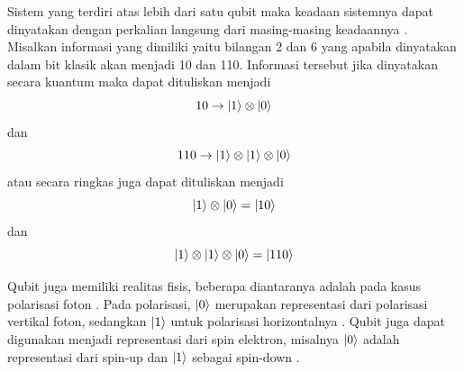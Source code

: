 \par
Sistem yang terdiri atas lebih dari satu qubit maka keadaan sistemnya dapat dinyatakan dengan perkalian langsung dari masing-masing keadaannya \cite{mermin2007quantum, bengtsson2017geometry, barnett2009quantum, schlosshauer2007decoherence}. Misalkan informasi yang dimiliki yaitu bilangan 2 dan 6 yang apabila dinyatakan dalam bit klasik akan menjadi 10 dan 110. Informasi tersebut jika dinyatakan secara kuantum maka dapat dituliskan menjadi
\begin{equation}
	10 \rightarrow \ket{1} \otimes \ket{0}
\end{equation}
dan
\begin{equation}
	110 \rightarrow \ket{1} \otimes \ket{1} \otimes \ket{0}
\end{equation}
atau secara ringkas juga dapat dituliskan menjadi
\begin{equation}
	\ket{1} \otimes \ket{0} = \ket{10}
\end{equation}
dan
\begin{equation}
	\ket{1} \otimes \ket{1} \otimes \ket{0} = \ket{110}
\end{equation}
\par

Qubit juga memiliki realitas fisis, beberapa diantaranya adalah pada kasus polarisasi foton \cite{nielsen2010quantum}. Pada polarisasi, $\ket{0}$ merupakan representasi dari polarisasi vertikal foton, sedangkan $\ket{1}$ untuk polarisasi horizontalnya \cite{kok2007linear}. Qubit juga dapat digunakan menjadi representasi dari spin elektron, misalnya $\ket{0}$ adalah representasi dari spin-up dan $\ket{1}$ sebagai spin-down \cite{sakurai2017modern}.

